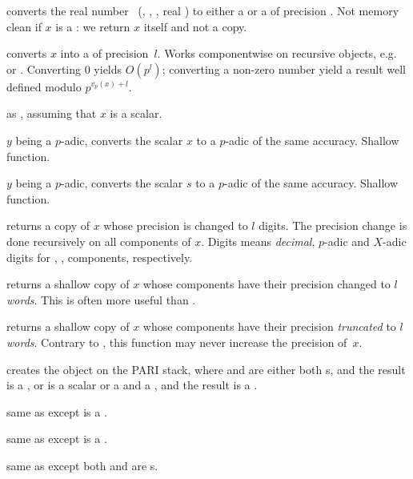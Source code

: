  converts the real number~
(, , , real ) to either
a  or a  of precision . Not memory clean
if $x$ is a : we return $x$ itself and not a copy.

 converts $x$ into a 
of precision~$l$. Works componentwise on recursive objects,
e.g.~ or . Converting $0$ yields $O(p^l)$; converting a
non-zero number yield a result well defined modulo $p^{v_p(x) + l}$.

 as , assuming that $x$
is a scalar.

 $y$ being a $p$-adic, converts the scalar $x$
to a $p$-adic of the same accuracy. Shallow function.

 $y$ being a $p$-adic, converts the scalar $s$
to a $p$-adic of the same accuracy. Shallow function.

 returns a copy of $x$ whose precision is
changed to $l$ digits. The precision change is done recursively on all
components of $x$. Digits means \emph{decimal}, $p$-adic and $X$-adic digits
for , ,  components, respectively.

 returns a shallow copy of $x$ whose
 components have their precision changed to $l$ \emph{words}. This
is often more useful than .

 returns a shallow copy of $x$ whose
 components have their precision \emph{truncated} to $l$
\emph{words}. Contrary to , this function may never increase
the precision of~$x$.


 creates the object  on
the PARI stack, where  and  are either both s, and the
result is a , or  is a scalar or a  and  a
, and the result is a .

 same as  except  is a
.

 same as  except  is a
.

 same as  except both
 and  are s.

